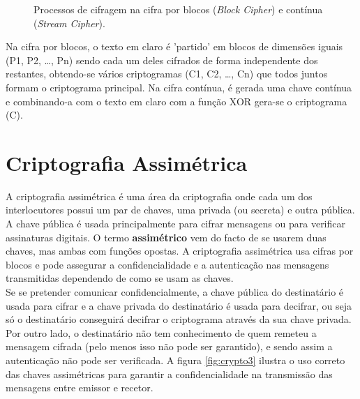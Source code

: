 \documentclass[a4paper,11pt,openright,oneside]{report}
\begin{document}
\begin{figure}[ht]
\center
{}
\caption{Processos de cifragem na cifra por blocos (\textit{Block Cipher}) e contínua (\textit{Stream Cipher}).}
\label{fig:crypto2}
\end{figure}

Na cifra por blocos, o texto em claro é 'partido' em blocos de dimensões iguais (P1, P2, …, Pn) sendo cada um deles cifrados de forma independente dos restantes, obtendo-se vários criptogramas (C1, C2, …, Cn) que todos juntos formam o criptograma principal. Na cifra contínua, é gerada uma chave contínua e combinando-a com o texto em claro com a função XOR gera-se o criptograma (C).

\section{Criptografia Assimétrica}
\label{chap.assimétrica}

A criptografia assimétrica é uma área da criptografia onde cada um dos interlocutores possui um par de chaves, uma privada (ou secreta) e outra pública. A chave pública é usada principalmente para cifrar mensagens ou para verificar assinaturas digitais. O termo \textbf{assimétrico} vem do facto de se usarem duas chaves, mas ambas com funções opostas. A criptografia assimétrica usa cifras por blocos e pode assegurar a confidencialidade e a autenticação nas mensagens transmitidas dependendo de como se usam as chaves.\\

Se se pretender comunicar confidencialmente, a chave pública do destinatário é usada para cifrar e a chave privada do destinatário é usada para decifrar, ou seja só o destinatário conseguirá decifrar o criptograma através da sua chave privada. Por outro lado, o destinatário não tem conhecimento de quem remeteu a mensagem cifrada (pelo menos isso não pode ser garantido), e sendo assim a autenticação não pode ser verificada. A figura \ref{fig:crypto3} ilustra o uso correto das chaves assimétricas para garantir a confidencialidade na transmissão das mensagens entre emissor e recetor.
\end{document}
